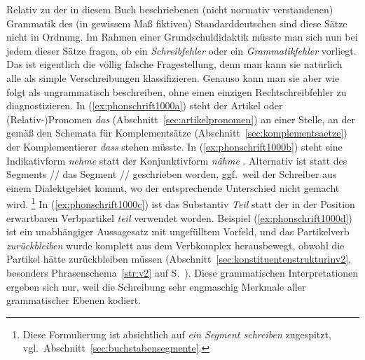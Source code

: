 \begin{exe}
  \ex\label{ex:phonschrift1000} 
  \begin{xlist}
  \end{xlist}
\end{exe}

Relativ zu der in diesem Buch beschriebenen (nicht normativ verstandenen) Grammatik des (in gewissem Maß fiktiven) Standarddeutschen sind diese Sätze nicht in Ordnung.
Im Rahmen einer Grundschuldidaktik müsste man sich nun bei jedem dieser Sätze fragen, ob ein \textit{Schreibfehler} oder ein \textit{Grammatikfehler} vorliegt.
Das ist eigentlich die völlig falsche Fragestellung, denn man kann sie natürlich alle als simple Verschreibungen klassifizieren.
Genauso kann man sie aber wie folgt als ungrammatisch beschreiben, ohne einen einzigen Rechtschreibfehler zu diagnostizieren.
In (\ref{ex:phonschrift1000a}) steht der Artikel oder (Relativ-)Pronomen \textit{das} (Abschnitt~\ref{sec:artikelpronomen}) an einer Stelle, an der gemäß den Schemata für Komplementsätze (Abschnitt~\ref{sec:komplementsaetze}) der Komplementierer \textit{dass} stehen müsste.
In (\ref{ex:phonschrift1000b}) steht eine Indikativform \textit{nehme} \textipa{[ne:me]} statt der Konjunktivform \textit{nähme} \textipa{[nE:me]}.
Alternativ ist statt des Segments // das Segment // geschrieben worden, ggf.\ weil der Schreiber aus einem Dialektgebiet kommt, wo der entsprechende Unterschied nicht gemacht wird.%
\footnote{Diese Formulierung ist absichtlich auf \textit{ein Segment schreiben} zugespitzt, vgl.\ Abschnitt~\ref{sec:buchstabensegmente}.}
In (\ref{ex:phonschrift1000c}) ist das Substantiv \textit{Teil} statt der in der Position erwartbaren Verbpartikel \textit{teil} verwendet worden.
Beispiel (\ref{ex:phonschrift1000d}) ist ein unabhängiger Aussagesatz mit ungefülltem Vorfeld, und das Partikelverb \textit{zurückbleiben} wurde komplett aus dem Verbkomplex herausbewegt, obwohl die Partikel hätte zurückbleiben müssen (Abschnitt~\ref{sec:konstituentenstrukturinv2}, besonders Phrasenschema~\ref{str:v2} auf S.~\pageref{str:v2}).
Diese grammatischen Interpretationen ergeben sich nur, weil die Schreibung sehr engmaschig Merkmale aller grammatischer Ebenen kodiert.
